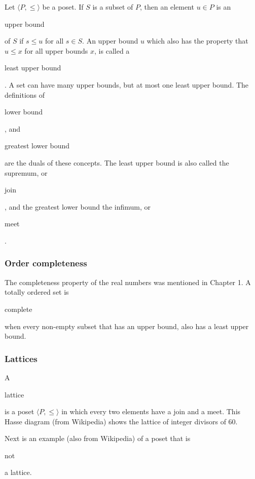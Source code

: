 \documentclass[11pt]{article}
\theoremstyle{plain}
\theoremstyle{definition}
\begin{document}
\noindent Let $ \langle P, \le \rangle $ be a poset.
If $ S $ is a subset of $ P $, then an element $ u \in P $ is an \begin{em}upper bound\end{em} of $ S $ if $ s \le u $ for all $ s \in S $.
An upper bound $ u $ which also has the property that $ u \le x $ for all upper bounds $ x $, is called a \begin{em}least upper bound\end{em}.
A set can have many upper bounds, but at most one least upper bound.
The definitions of \begin{em}lower bound\end{em}, and \begin{em}greatest lower bound\end{em} are the duals of these concepts.
The least upper bound is also called the supremum, or \begin{em}join\end{em}, and the greatest lower bound the infimum, or \begin{em}meet\end{em}.

\subsubsection*{Order completeness}

The completeness property of the real numbers was mentioned in Chapter 1.
A totally ordered set is \begin{em}complete\end{em} when every non-empty subset that has an upper bound, also has a least upper bound.

\subsubsection*{Lattices}

A \begin{em}lattice\end{em} is a poset $ \langle P, \le \rangle $ in which every two elements have a join and a meet. 
This Hasse diagram (from Wikipedia) shows the lattice of integer divisors of $ 60 $.

\begin{center}
  \def\svgwidth{0.4\columnwidth}
  
\end{center}

\noindent Next is an example (also from Wikipedia) of a poset that is \begin{em}not\end{em} a lattice.
\end{document}
